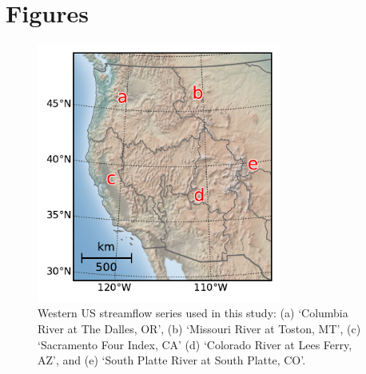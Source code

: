 \documentclass[final, double]{ua-thesis}
\begin{document}
\clearpage
\section{Figures}

\begin{figure}[ht]
 \centerline{\includegraphics[width=19pc]{p2figures/fig_samplemap.pdf}}
  \caption{Western US streamflow series used in this study: (a) `Columbia River at The Dalles, OR', (b) `Missouri River at Toston, MT', (c) `Sacramento Four Index, CA' (d) `Colorado River at Lees Ferry, AZ', and (e) `South Platte River at South Platte, CO'.}\label{fig_samplemap}
\end{figure}
\end{document}
